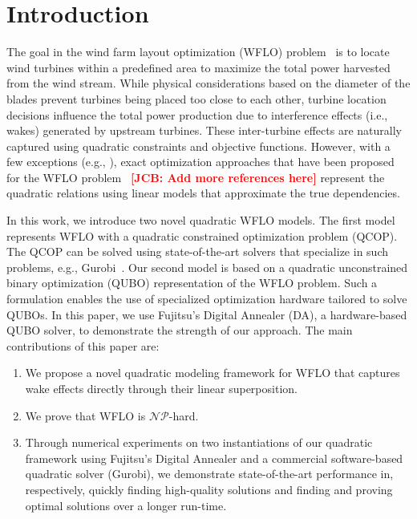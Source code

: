 \documentclass[preprint,12pt]{elsarticle}
\newcommand{\todo}[1]{{\textcolor{red}{\bf {#1}}}}
\begin{document}
\maketitle 

\section{Introduction}
The goal in the wind farm layout optimization (WFLO)
problem~\cite{MOSETTI1994105} is to locate wind turbines within a
predefined area to maximize the total power harvested from the wind
stream.  While physical considerations based on the diameter of the
blades prevent turbines being placed too close to each other, turbine
location decisions influence the total power production due to
interference effects (i.e., wakes) generated by upstream turbines.
These inter-turbine effects are naturally captured using quadratic
constraints and objective functions. However, with a few exceptions (e.g., \cite{turner2014new}), exact optimization
approaches that have been proposed for the WFLO
problem~\cite{Zhang2014,kuo2016wind} \todo{[JCB: Add more references here]}
represent the quadratic relations using linear models
that approximate the true dependencies.

In this work, we introduce two novel quadratic WFLO models. The first
model represents WFLO with a quadratic constrained optimization
problem (QCOP).  The QCOP can be solved using state-of-the-art solvers
that specialize in such problems, e.g., Gurobi~\cite{gurobi}.  Our
second model is based on a quadratic unconstrained binary optimization
(QUBO) representation of the WFLO problem.  Such a formulation enables the use of
specialized optimization hardware tailored to solve QUBOs. In this
paper, we use Fujitsu's Digital Annealer (DA), a hardware-based
QUBO solver, to demonstrate the strength of our approach. The main
contributions of this paper are:
\begin{enumerate} 
\item We propose a novel quadratic modeling framework for WFLO that captures wake 
effects directly through their linear superposition. 
\item We prove that WFLO is $\mathcal{NP}$-hard.
\item Through numerical experiments on two instantiations of our quadratic framework using Fujitsu's Digital Annealer and a commercial software-based quadratic solver (Gurobi), we demonstrate state-of-the-art performance in, respectively, quickly finding high-quality solutions and finding and proving optimal solutions over a longer run-time.
\end{enumerate}
\end{document}
